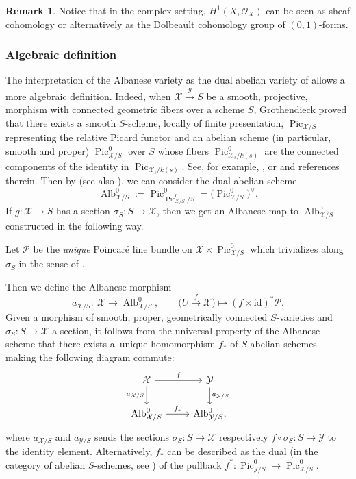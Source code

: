 \documentclass[11pt]{article}
\numberwithin{equation}{section}
\newcommand{\Pic}{\operatorname{Pic}}
\newcommand{\Alb}{\operatorname{Alb}}
\newcommand{\X}{\mathcal{X}}
\renewcommand{\O}{\mathcal{O}}
\newcommand{\Y}{\mathcal{Y}}
\numberwithin{equation}{section}
\theoremstyle{definition}
\newtheorem{remarkk}[theo]{Remark}
\begin{document}
\begin{remarkk}
 Notice that in the complex setting, $H^1(X,\O_X)$ can be seen as sheaf cohomology or alternatively as the Dolbeault cohomology group of $(0,1)$-forms.
\end{remarkk}



\subsubsection{Algebraic definition}
The interpretation of the Albanese variety as the dual abelian variety of 
allows a more algebraic definition.
 Indeed, when $\X\xrightarrow{g} S$ be a smooth, projective, morphism with connected geometric fibers over a scheme $S$, Grothendieck proved that there exists a smooth $S$-scheme, locally of finite presentation, $\Pic_{\X\slash S}$ representing the relative Picard functor and an abelian scheme (in particular, smooth and proper) $\Pic^0_{\X\slash S}$ over $S$ whose fibers $\Pic^0_{\X_s\slash k(s)}$ are the connected components of the identity in $\Pic_{\X_s\slash k(s)}$. See, for example, \cite[Section~9]{fantechi2006fundamental}, or \cite[Chapter~8]{bosch2012neron} and references therein.
Then by \cite[Theorem~3.3]{grothendieck1961technique} (see also \cite{milneAV,mochizuki2012topics}), we can consider the dual abelian scheme
\[\Alb^0_{\X\slash S}:=\Pic^0_{\Pic^0_{\X/S}\slash S}=\bigl(\Pic^0_{\X\slash S}\bigr)^\vee.\]
If $g\colon \X\to S$ has a section $\sigma_S\colon S\to\X$, then we get an Albanese map to $\Alb^0_{\X\slash S}$ constructed in the following way.

Let $\mathcal P$ be the \emph{unique} Poincar\'e line bundle on $\X\times\Pic^0_{\X\slash S}$ which trivializes along $\sigma_S$ in the sense of \cite[Section~4]{bosch2012neron}.

Then we define the Albanese morphism
\[
 a_{\X\slash S}\colon \ \X \longrightarrow \Alb^0_{\X\slash S},\qquad
 \big(U\xrightarrow{f} \X\big) \longmapsto (f\times\mathrm{id})^*\mathcal P.
 \]
Given \smash{$\X\xrightarrow{f} \Y$} a morphism of smooth, proper, geometrically connected $S$-varieties and $\sigma_S\colon S\allowbreak\to \X$ a section, it follows from the universal property of the Albanese scheme that there exists a~unique homomorphism $f_*$ of $S$-abelian schemes making the following diagram commute:
\[
\begin{tikzcd}
\X\ar[r,"f"]\ar[d,"a_{\X\slash S}"'] & \Y\ar[d,"a_{\Y\slash S}"]\\
\Alb^0_{\X\slash S}\ar[r,"f_*"] & \Alb^0_{\Y\slash S},
\end{tikzcd}
\]
where $a_{\X\slash S}$ and $a_{\Y\slash S}$ sends the sections $\sigma_S\colon S\to \X$ respectively $f\circ \sigma_S \colon S\to \Y$ to the identity element. Alternatively, $f_*$ can be described as the dual (in the category of abelian $S$-schemes, see \cite[Section~I.8]{milneAV}) of the pullback
$f^*\colon \Pic^0_{\Y\slash S}\to \Pic^0_{\X\slash S}$.
\end{document}
